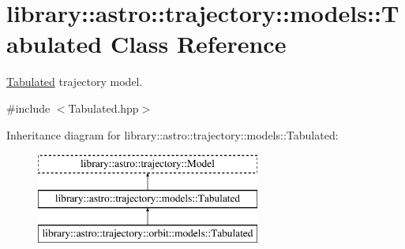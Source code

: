 \hypertarget{classlibrary_1_1astro_1_1trajectory_1_1models_1_1_tabulated}{}\section{library\+:\+:astro\+:\+:trajectory\+:\+:models\+:\+:Tabulated Class Reference}
\label{classlibrary_1_1astro_1_1trajectory_1_1models_1_1_tabulated}


\hyperlink{classlibrary_1_1astro_1_1trajectory_1_1models_1_1_tabulated}{Tabulated} trajectory model.  




{\ttfamily \#include $<$Tabulated.\+hpp$>$}

Inheritance diagram for library\+:\+:astro\+:\+:trajectory\+:\+:models\+:\+:Tabulated\+:\begin{figure}[H]
\begin{center}
\leavevmode
\includegraphics[height=3.000000cm]{classlibrary_1_1astro_1_1trajectory_1_1models_1_1_tabulated}
\end{center}
\end{figure}
